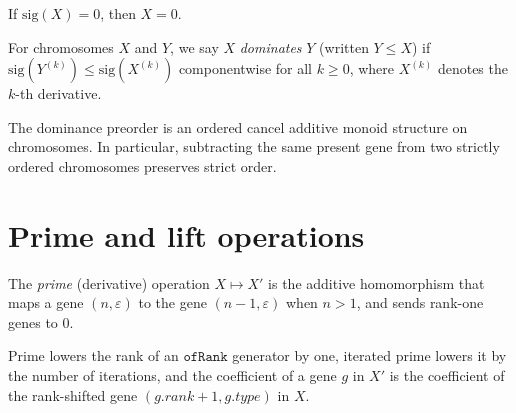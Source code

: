 \begin{lemma}
  \label{lem:Chromosome.signature_eq_zero}
  \leanok
  If $\mathrm{sig}(X)=0$, then $X=0$.
\end{lemma}

\begin{definition}
  \label{def:Chromosome.Dominates}
  \leanok
  For chromosomes $X$ and $Y$, we say $X$ \emph{dominates} $Y$ (written $Y \le X$) if
  $\mathrm{sig}(Y^{(k)}) \le \mathrm{sig}(X^{(k)})$ componentwise for all $k \ge 0$,
  where $X^{(k)}$ denotes the $k$-th derivative.
\end{definition}

\begin{lemma}
  \label{lem:Chromosome.ordered_cancel}
  \leanok
  The dominance preorder is an ordered cancel additive monoid structure on
  chromosomes.  In particular, subtracting the same present gene from two
  strictly ordered chromosomes preserves strict order.
\end{lemma}

\section{Prime and lift operations}

\begin{definition}
  \label{def:Chromosome.prime}
  \leanok
  The \emph{prime} (derivative) operation $X \mapsto X'$ is the additive homomorphism
  that maps a gene $(n, \varepsilon)$ to the gene $(n-1,\varepsilon)$ when
  $n>1$, and sends rank-one genes to $0$.
\end{definition}

\begin{lemma}
  \label{lem:Chromosome.prime_generators}
  \leanok
  Prime lowers the rank of an $\mathtt{ofRank}$ generator by one, iterated
  prime lowers it by the number of iterations, and the coefficient of a gene
  $g$ in $X'$ is the coefficient of the rank-shifted gene $(g.rank+1,g.type)$
  in $X$.
\end{lemma}

